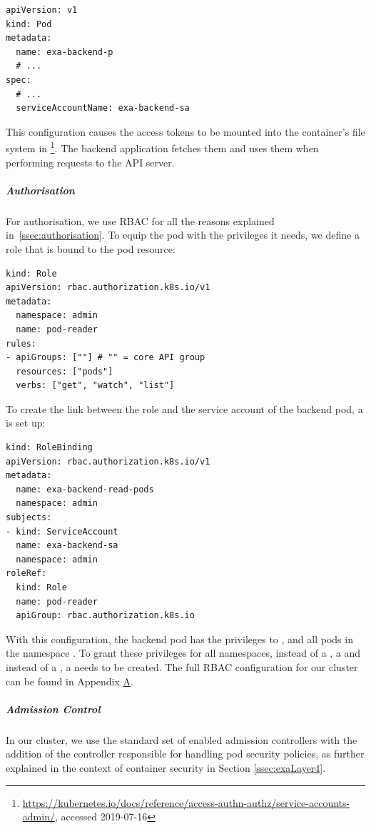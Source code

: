 \begin{verbatim}
apiVersion: v1
kind: Pod
metadata:
  name: exa-backend-p
  # ...
spec:
  # ...
  serviceAccountName: exa-backend-sa
\end{verbatim}

This configuration causes the access tokens to be mounted into the container's file system in \footnote{\url{https://kubernetes.io/docs/reference/access-authn-authz/service-accounts-admin/}, accessed 2019-07-16}. The backend application fetches them and uses them when performing requests to the API server.

\subparagraph{Authorisation}
For authorisation, we use \ac{RBAC} for all the reasons explained in~\ref{ssec:authorisation}. To equip the pod with the privileges it needs, we define a role that is bound to the pod resource:

\begin{verbatim}
kind: Role
apiVersion: rbac.authorization.k8s.io/v1
metadata:
  namespace: admin
  name: pod-reader
rules:
- apiGroups: [""] # "" = core API group
  resources: ["pods"]
  verbs: ["get", "watch", "list"]
\end{verbatim}

To create the link between the role and the service account of the backend pod, a  is set up: 

\begin{verbatim}
kind: RoleBinding
apiVersion: rbac.authorization.k8s.io/v1
metadata:
  name: exa-backend-read-pods
  namespace: admin
subjects:
- kind: ServiceAccount
  name: exa-backend-sa 
  namespace: admin
roleRef:
  kind: Role
  name: pod-reader
  apiGroup: rbac.authorization.k8s.io
\end{verbatim}

With this configuration, the backend pod has the privileges to ,  and  all pods in the namespace . To grant these privileges for all namespaces, instead of a , a  and instead of a , a  needs to be created. The full \ac{RBAC} configuration for our cluster can be found in Appendix \hyperref[apx:A]{A}.

\subparagraph{Admission Control}

In our cluster, we use the standard set of enabled admission controllers with the addition of the controller responsible for handling pod security policies, as further explained in the context of container security in Section \ref{ssec:exaLayer4}.


